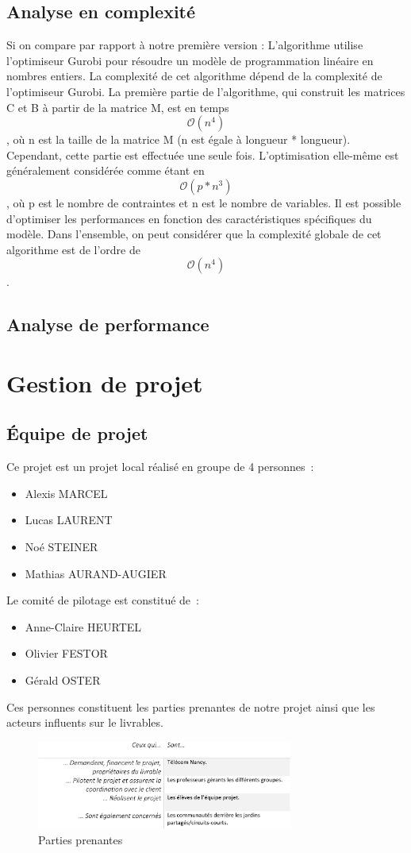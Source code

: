 \documentclass[french,a4paper]{article}
\begin{document}
\subsection{Analyse en complexité}
Si on compare par rapport à notre première version :
L'algorithme utilise l'optimiseur Gurobi pour résoudre un modèle de programmation linéaire en nombres entiers. La complexité de cet algorithme dépend de la complexité de l'optimiseur Gurobi.
La première partie de l'algorithme, qui construit les matrices C et B à partir de la matrice M, est en temps \[\mathcal{O}(n^4)\], où n est la taille de la matrice M (n est égale à longueur * longueur). Cependant, cette partie est effectuée une seule fois.
L'optimisation elle-même est généralement considérée comme étant en \[\mathcal{O}(p*n^3)\], où p est le nombre de contraintes et n est le nombre de variables. Il est possible d'optimiser les performances en fonction des caractéristiques spécifiques du modèle.
Dans l'ensemble, on peut considérer que la complexité globale de cet algorithme est de l'ordre de \[\mathcal{O}(n^4)\].
\subsection{Analyse de performance}
\newpage
\section{Gestion de projet}
\subsection{Équipe de projet}
Ce projet est un projet local réalisé en groupe de 4 personnes~:
\begin{itemize}
    \item Alexis MARCEL
    \item Lucas LAURENT
    \item Noé STEINER
    \item Mathias AURAND-AUGIER
\end{itemize}
Le comité de pilotage est constitué de~:
\begin{itemize}
    \item Anne-Claire HEURTEL
    \item Olivier FESTOR
    \item Gérald OSTER
\end{itemize}
Ces personnes constituent les parties prenantes de notre projet ainsi que les acteurs influents sur le livrables.
\begin{figure}[H]
    \centering
    \includegraphics[width=0.75\textwidth]{img/parties_prenantes.png}
    \caption{Parties prenantes}
\end{figure}
\end{document}
